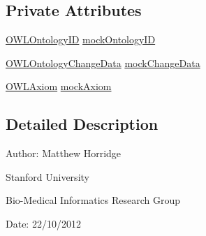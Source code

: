 \subsection*{Private Attributes}
\begin{DoxyCompactItemize}
\item 
\hyperlink{classorg_1_1semanticweb_1_1owlapi_1_1model_1_1_o_w_l_ontology_i_d}{O\-W\-L\-Ontology\-I\-D} \hyperlink{classorg_1_1semanticweb_1_1owlapi_1_1api_1_1test_1_1ontology_1_1_o_w_l_ontology_change_record_test_case_aad24e039391ff4d5107ec8e00240582e}{mock\-Ontology\-I\-D}
\item 
\hyperlink{classorg_1_1semanticweb_1_1owlapi_1_1change_1_1_o_w_l_ontology_change_data}{O\-W\-L\-Ontology\-Change\-Data} \hyperlink{classorg_1_1semanticweb_1_1owlapi_1_1api_1_1test_1_1ontology_1_1_o_w_l_ontology_change_record_test_case_ac40874a3188e545e7d13dcd51da5ec39}{mock\-Change\-Data}
\item 
\hyperlink{interfaceorg_1_1semanticweb_1_1owlapi_1_1model_1_1_o_w_l_axiom}{O\-W\-L\-Axiom} \hyperlink{classorg_1_1semanticweb_1_1owlapi_1_1api_1_1test_1_1ontology_1_1_o_w_l_ontology_change_record_test_case_aa88f6815b1a971068529a966700989c8}{mock\-Axiom}
\end{DoxyCompactItemize}


\subsection{Detailed Description}
Author\-: Matthew Horridge\par
 Stanford University\par
 Bio-\/\-Medical Informatics Research Group\par
 Date\-: 22/10/2012 

